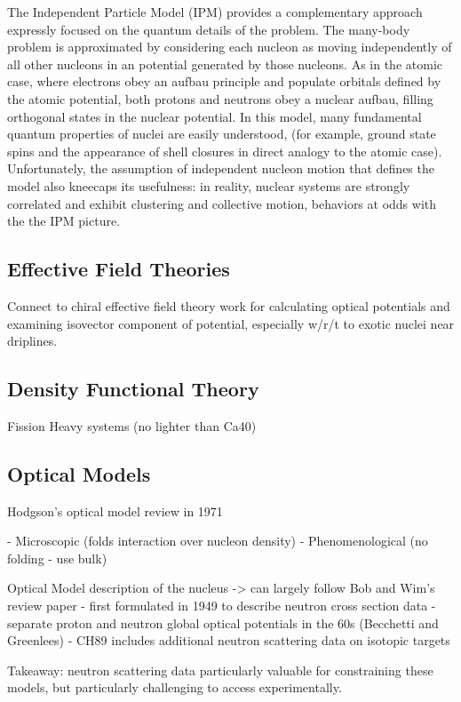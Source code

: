 The Independent Particle Model (IPM) provides a complementary approach expressly
focused on the quantum details of the problem. The many-body problem is
approximated by considering each nucleon as moving independently of all other
nucleons in an potential generated by those nucleons. As in the atomic case,
where electrons obey an aufbau principle and populate orbitals defined by the
atomic potential, both protons and neutrons obey a nuclear aufbau, filling
orthogonal states in the nuclear potential. In this model, many fundamental
quantum properties of nuclei are easily understood, (for example, ground state spins and
the appearance of shell closures in direct analogy to the atomic case).
Unfortunately, the assumption of independent nucleon motion that defines the model
also kneecaps its usefulness: in reality, nuclear systems are strongly
correlated and exhibit clustering and collective motion, behaviors at odds with the
the IPM picture.

\subsection{Effective Field Theories}
Connect to chiral effective field theory work for calculating optical potentials
and examining isovector component of potential, especially w/r/t to exotic
nuclei near driplines.

\subsection{Density Functional Theory}
Fission
Heavy systems (no lighter than Ca40)

\subsection{Optical Models}
Hodgson's optical model review in 1971

- Microscopic (folds interaction over nucleon density)
- Phenomenological (no folding - use bulk)

Optical Model description of the nucleus
-> can largely follow Bob and Wim's review paper
- first formulated in 1949 to describe neutron cross section data
- separate proton and neutron global optical potentials in the 60s (Becchetti
and Greenlees)
- CH89 includes additional neutron scattering data on isotopic targets

Takeaway: neutron scattering data particularly valuable for constraining these
models, but particularly challenging to access experimentally.

